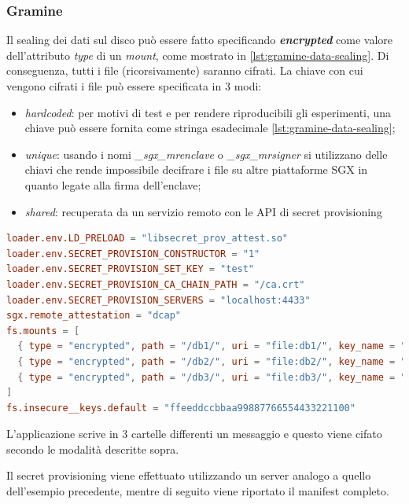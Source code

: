 \documentclass{article}
\begin{document}
\subsubsection{Gramine}
Il sealing dei dati sul disco può essere fatto specificando \textbf{\textit{encrypted}} come valore dell'attributo \textit{type} di un \textit{mount}, come mostrato in \cref{lst:gramine-data-sealing}. Di conseguenza, tutti i file (ricorsivamente) saranno cifrati. La chiave con cui vengono cifrati i file può essere specificata in $3$ modi:
\begin{itemize}
  \item \textit{hardcoded}: per motivi di test e per rendere riproducibili gli esperimenti, una chiave può essere fornita come stringa esadecimale \cref{lst:gramine-data-sealing};
  \item \textit{unique}: usando i nomi \textit{\_sgx\_mrenclave} o \textit{\_sgx\_mrsigner} si utilizzano delle chiavi che rende impossibile decifrare i file su altre piattaforme SGX in quanto legate alla firma dell'enclave;
  \item \textit{shared}: recuperata da un servizio remoto con le API di secret provisioning
\end{itemize}

\begin{lstlisting}[language=toml,caption=Cartelle cifrate con differenti modalità,label=lst:gramine-data-sealing]
loader.env.LD_PRELOAD = "libsecret_prov_attest.so"
loader.env.SECRET_PROVISION_CONSTRUCTOR = "1"
loader.env.SECRET_PROVISION_SET_KEY = "test"
loader.env.SECRET_PROVISION_CA_CHAIN_PATH = "/ca.crt"
loader.env.SECRET_PROVISION_SERVERS = "localhost:4433"
sgx.remote_attestation = "dcap"
fs.mounts = [
  { type = "encrypted", path = "/db1/", uri = "file:db1/", key_name = "default" },
  { type = "encrypted", path = "/db2/", uri = "file:db2/", key_name = "_sgx_mrenclave" },
  { type = "encrypted", path = "/db3/", uri = "file:db3/", key_name = "test" },
]
fs.insecure__keys.default = "ffeeddccbbaa99887766554433221100"
\end{lstlisting}
L'applicazione scrive in $3$ cartelle differenti un messaggio e questo viene cifato secondo le modalità descritte sopra. 



Il secret provisioning viene effettuato utilizzando un server analogo a quello dell'esempio precedente, mentre di seguito viene riportato il manifest completo.
\end{document}

